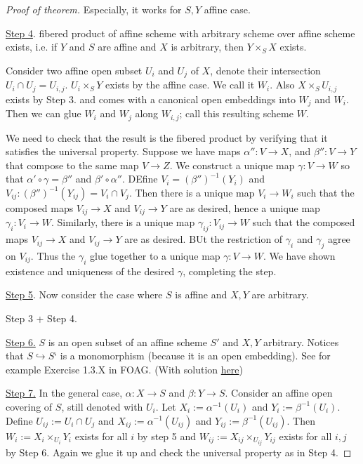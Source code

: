 \documentclass[11pt]{article}
\theoremstyle{definition}
\newcommand{\lrta}{\longrightarrow}
\newcommand{\inj}{\hookrightarrow}
\begin{document}
\begin{proof}[Proof of theorem]
Especially, it works for $S,Y$ affine case. 

\underline{Step 4}. fibered product of affine scheme with arbitrary scheme over affine scheme exists, i.e. if $Y$ and $S$ are affine and $X$ is arbitrary, then $Y\times_S X$ exists.

Consider two affine open subset $U_i$ and $U_j$ of $X$, denote their intersection $U_i\cap U_j=U_{i,j}$.  $U_i\times_S Y$ exists by the affine case. We call it $W_i$. Also $X\times_S U_{i,j}$ exists by Step 3. and comes with a canonical open embeddings into $W_j$ and $W_i$. Then we can glue $W_i$ and $W_j$ along $W_{i,j}$; call this resulting scheme $W$.

We need to check that the result is the fibered product by verifying that it satisfies the universal property. Suppose we have maps $\alpha'':V\lrta X$, and $\beta'':V\lrta Y$ that compose to the same map $V\lrta Z$. We construct a unique map $\gamma:V\lrta W$ so that $\alpha'\circ \gamma=\beta''$ and $\beta'\circ \alpha''$. DEfine $V_i=(\beta'')^{-1}(Y_i)$ and $V_{ij}:(\beta'')^{-1}(Y_{ij})=V_i\cap V_j$. Then there is a unique map $V_i\lrta W_i$ such that the composed maps $V_{ij}\lrta X$ and $V_{ij}\lrta Y$ are as desired, hence a unique map $\gamma_i:V_i\lrta W$. Similarly, there is a unique map $\gamma_{ij}:V_{ij}\lrta W$ such that the composed maps $V_{ij}\lrta X$ and $V_{ij}\lrta Y$ are as desired. BUt the restriction of $\gamma_{i}$ and $\gamma_{j}$ agree on $V_{ij}$. Thus the $\gamma_i$ glue together to a unique map $\gamma:V\lrta W$. We have shown existence and uniqueness of the desired $\gamma$, completing the step.

\underline{Step 5}. Now consider the case where $S$ is affine and $X, Y$ are arbitrary. 

Step 3 + Step 4.

\underline{Step 6.} $S$ is an open subset of an affine scheme $S'$ and $X,Y$ arbitrary. Notices that $S\inj S‘$ is a monomorphism (because it is an open embedding). See for example Exercise 1.3.X in FOAG. (With solution \href{https://ldxiao.github.io/images/FOAG.pdf}{here})

\underline{Step 7.} In the general case, $\alpha:X\lrta S$ and $\beta:Y\lrta S$. Consider an affine open covering of $S$, still denoted with $U_i$. Let $X_i:=\alpha^{-1}(U_i)$ and $Y_i:=\beta^{-1}(U_i)$. Define $U_{ij}:=U_i\cap U_j$ and $X_{ij}:=\alpha^{-1}(U_{ij})$ and $Y_{ij}:=\beta^{-1}(U_{ij})$. Then $W_i:=X_i\times_{U_i}Y_i$ exists for all $i$ by step 5 and $W_{ij}:=X_{ij}\times_{U_{ij}}Y_{ij}$ exists for all $i,j$ by Step 6. Again we glue it up and check the universal property as in Step 4.
\end{proof}
\end{document}
